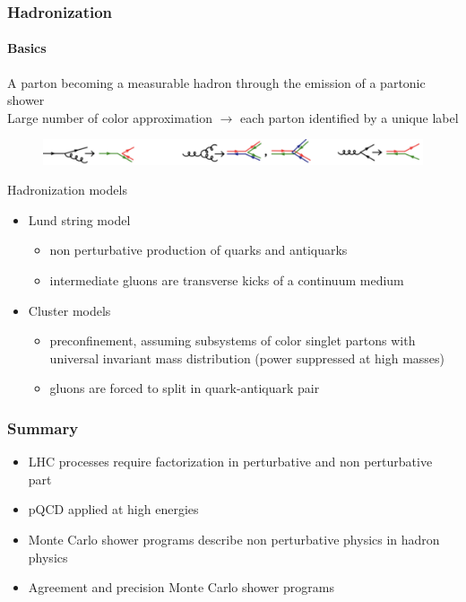 \documentclass[aspectratio=43]{beamer}
\begin{document}
\begin{frame}
	
	\frametitle{Hadronization}
	\framesubtitle{Basics}

	\footnotesize A parton becoming a measurable hadron through the emission of a partonic shower \\
	\footnotesize Large number of color approximation $\rightarrow$ each parton identified by a unique label \\

	\begin{figure}
		\includegraphics[width = 8.5 cm]{plots/hadronization.png}
	\end{figure}

	\footnotesize Hadronization models
	\begin{itemize}
		\item Lund string model
		\begin{itemize}
			\item \footnotesize non perturbative production of quarks and antiquarks
			\item \footnotesize intermediate gluons are transverse kicks of a continuum medium
		\end{itemize}
		\item Cluster models
		\begin{itemize}
			\item \footnotesize preconfinement, assuming subsystems of color singlet partons
			with universal invariant mass distribution (power suppressed at high masses)
			\item gluons are forced to split in quark-antiquark pair
		\end{itemize}
	\end{itemize}

\end{frame}

\begin{frame}

	\frametitle{Summary}

\begin{itemize}
	\item \footnotesize LHC processes require factorization in perturbative and non perturbative part
	\item \footnotesize pQCD applied at high energies
	\item \footnotesize Monte Carlo shower programs describe non perturbative physics in hadron physics
	\item \footnotesize Agreement and precision Monte Carlo shower programs
\end{itemize}

\end{frame}
\end{document}
